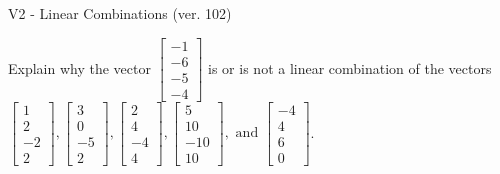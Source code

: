 \begin{exercise}
  \begin{exerciseTitle}V2 - Linear Combinations (ver. 102)\end{exerciseTitle}
  \begin{exerciseStatement}
    Explain why the vector \(\left[\begin{array}{c}
-1 \\
-6 \\
-5 \\
-4
\end{array}\right]\)  is or is not a linear 
	combination of the vectors \(\left[\begin{array}{c}
1 \\
2 \\
-2 \\
2
\end{array}\right] , \left[\begin{array}{c}
3 \\
0 \\
-5 \\
2
\end{array}\right] , \left[\begin{array}{c}
2 \\
4 \\
-4 \\
4
\end{array}\right] , \left[\begin{array}{c}
5 \\
10 \\
-10 \\
10
\end{array}\right] , \text{ and } \left[\begin{array}{c}
-4 \\
4 \\
6 \\
0
\end{array}\right]\).
	



\end{exerciseStatement}
\end{exercise}
